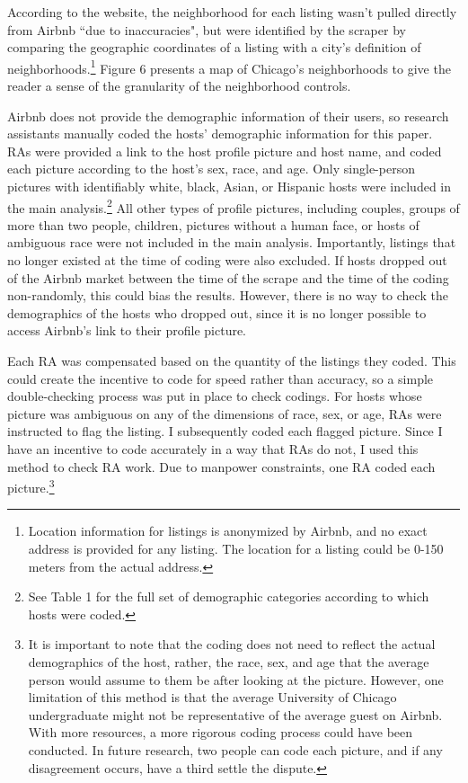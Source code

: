 According to the website, the neighborhood for each listing wasn't pulled directly from Airbnb ``due to inaccuracies", but were identified by the scraper by comparing the geographic coordinates of a listing with a city's definition of neighborhoods.\footnote{Location information for listings is anonymized by Airbnb, and no exact address is provided for any listing. The location for a listing could be 0-150 meters from the actual address.} Figure 6 presents a map of Chicago's neighborhoods to give the reader a sense of the granularity of the neighborhood controls. 

Airbnb does not provide the demographic information of their users, so research assistants manually coded the hosts' demographic information for this paper. RAs were provided a link to the host profile picture and host name, and coded each picture according to the host's sex, race, and age. Only single-person pictures with identifiably white, black, Asian, or Hispanic hosts were included in the main analysis.\footnote{See Table 1 for the full set of demographic categories according to which hosts were coded.} All other types of profile pictures, including couples, groups of more than two people, children, pictures without a human face, or hosts of ambiguous race were not included in the main analysis. Importantly, listings that no longer existed at the time of coding were also excluded. If hosts dropped out of the Airbnb market between the time of the scrape and the time of the coding non-randomly, this could bias the results. However, there is no way to check the demographics of the hosts who dropped out, since it is no longer possible to access Airbnb's link to their profile picture. 

Each RA was compensated based on the quantity of the listings they coded. This could create the incentive to code for speed rather than accuracy, so a simple double-checking process was put in place to check codings. For hosts whose picture was ambiguous on any of the dimensions of race, sex, or age, RAs were instructed to flag the listing. I subsequently coded each flagged picture. Since I have an incentive to code accurately in a way that RAs do not, I used this method to check RA work. Due to manpower constraints, one RA coded each picture.\footnote{It is important to note that the coding does not need to reflect the actual demographics of the host, rather, the race, sex, and age that the average person would assume to them be after looking at the picture. However, one limitation of this method is that the average University of Chicago undergraduate might not be representative of the average guest on Airbnb. With more resources, a more rigorous coding process could have been conducted. In future research, two people can code each picture, and if any disagreement occurs, have a third settle the dispute.}

